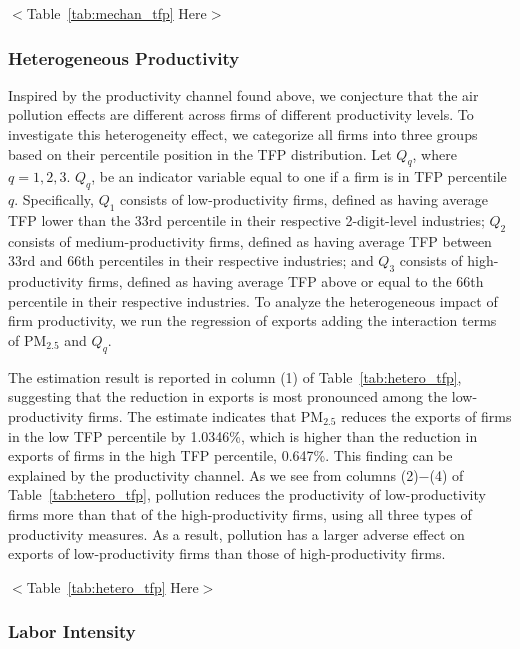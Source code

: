 \documentclass[12pt]{article}
\begin{document}
\begin{center}
$<$Table~\ref{tab:mechan_tfp} Here$>$
\end{center}

\subsubsection{Heterogeneous Productivity}

Inspired by the productivity channel found above, we conjecture that the air pollution effects are different across firms of different
productivity levels. To investigate this heterogeneity effect, we categorize all firms into three groups based on their percentile position in the TFP distribution. Let $Q_{q}$, where $q = 1, 2, 3$. $Q_{q}$, be an indicator variable equal to one if a firm is in TFP percentile $q$. Specifically, $Q_{1}$ consists of low-productivity firms, defined as having average TFP lower than the 33rd percentile in their respective 2-digit-level industries; $Q_{2}$ consists of medium-productivity firms, defined as having average TFP between 33rd and 66th percentiles in their respective industries; and $Q_{3}$ consists of high-productivity firms, defined as having average TFP above or equal to the 66th percentile in their respective industries. To analyze the heterogeneous impact of firm productivity, we run the regression of exports adding the interaction terms of $\mathrm{PM_{2.5}}$ and $Q_{q}$.

The estimation result is reported in column (1) of Table~\ref{tab:hetero_tfp}, suggesting that the reduction in exports is most pronounced among the low-productivity firms. The estimate indicates that $\mathrm{PM_{2.5}}$ reduces the exports of firms in the low TFP percentile by 1.0346\%, which is higher than the reduction in exports of firms in the high TFP percentile, 0.647\%. This finding can be explained by the productivity channel. As we see from columns (2)$-$(4) of Table~\ref{tab:hetero_tfp}, pollution reduces the productivity of low-productivity firms more than that of the high-productivity firms, using all three types of productivity measures. As a result, pollution has a larger adverse effect on exports of low-productivity firms than those of high-productivity firms.   

\begin{center}
$<$Table~\ref{tab:hetero_tfp} Here$>$
\end{center}

\subsubsection{Labor Intensity}
\end{document}
